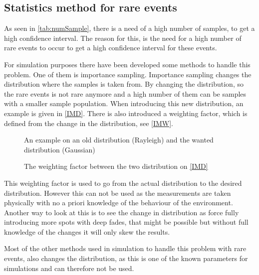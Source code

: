 \newpage
\subsection{Statistics method for rare events}\label{sampleEQ}
As seen in \autoref{tab:numSample}, there is a need of a high number of samples, to get a high confidence interval. The reason for this, is the need for a high number of rare events to occur to get a high confidence interval for these events. 

For simulation purposes there have been developed some methods to handle this problem. One of them is importance sampling. Importance sampling changes the distribution where the samples is taken from. By changing the distribution, so the rare events is not rare anymore and a high number of them can be samples with a smaller sample population. When introducing this new distribution, an example is given in \autoref{IMD}. There is also introduced a weighting factor, which is defined from the change in the distribution, see \autoref{IMW}. 

\begin{minipage}[t]{0.48\textwidth}
\centering
\begin{figure}[H]

\caption{An example on an old distribution (Rayleigh) and the wanted distribution (Gaussian)}
\label{IMD}
\end{figure}
\end{minipage}%
\hspace{0.03\textwidth}
\begin{minipage}[t]{0.48\textwidth}
\centering
\begin{figure}[H]

\caption{The weighting factor between the two distribution on \autoref{IMD}}
\label{IMW}
\end{figure}
\end{minipage}
\vspace{1em}

This weighting factor is used to go from the actual distribution to the desired distribution. However this can not be used as the measurements are taken physically with no a priori knowledge of the behaviour of the environment. Another way to look at this is to see the change in distribution as force fully introducing more spots with deep fades, that might be possible but without full knowledge of the changes it will only skew the results.

Most of the other methods  used in simulation to handle this problem with rare events, also changes the distribution, as this is one of the known parameters for simulations and can therefore not be used. 


